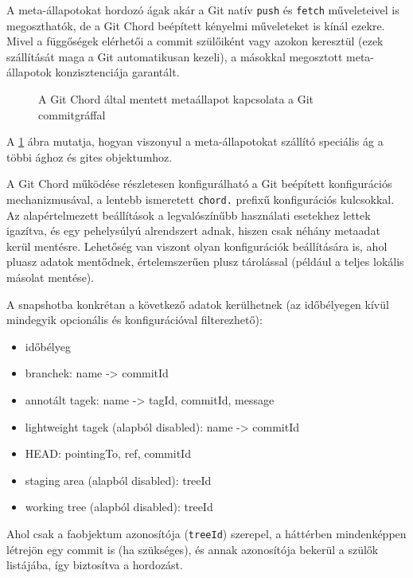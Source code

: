 \documentclass[
]{elteikthesis}[2025/03/25]
\begin{document}
A meta-állapotokat hordozó ágak akár a Git natív \verb|push| és \verb|fetch| műveleteivel is megoszthatók,
de a Git Chord beépített kényelmi műveleteket is kínál ezekre.
Mivel a függőségek elérhetői a commit szülőiként vagy azokon keresztül (ezek szállítását maga a Git automatikusan kezeli),
a másokkal megosztott meta-állapotok konzisztenciája garantált.

\begin{figure}[h!]
\centering

\caption{A Git Chord által mentett metaállapot kapcsolata a Git commitgráffal}
\label{fig:git-chord-dag}
\end{figure}

A \ref{fig:git-chord-dag} ábra mutatja, hogyan viszonyul a meta-állapotokat szállító
speciális ág a többi ághoz és gites objektumhoz.

A Git Chord működése részletesen konfigurálható a Git beépített konfigurációs mechanizmusával,
a lentebb ismeretett \verb|chord.| prefixű konfigurációs kulcsokkal.
Az alapértelmezett beállítások a legvalószínűbb használati esetekhez lettek igazítva,
és egy pehelysúlyú alrendszert adnak, hiszen csak néhány metaadat kerül mentésre.
Lehetőség van viszont olyan konfigurációk beállítására is,
ahol pluasz adatok mentődnek, értelemszerűen plusz tárolással
(például a teljes lokális másolat mentése).

A snapshotba konkrétan a következő adatok kerülhetnek
(az időbélyegen kívül mindegyik opcionális és konfigurációval filterezhető):

\begin{itemize}
    \item időbélyeg
    \item branchek: name -> commitId
    \item annotált tagek: name -> tagId, commitId, message
    \item lightweight tagek (alapból disabled): name -> commitId
    \item HEAD: pointingTo, ref, commitId
    \item staging area (alapból disabled): treeId
    \item working tree (alapból disabled): treeId
\end{itemize}
 
Ahol csak a faobjektum azonosítója (\verb|treeId|) szerepel,
a háttérben mindenképpen létrejön egy commit is (ha szükséges),
és annak azonosítója bekerül a szülők listájába,
így biztosítva a hordozást.
\end{document}
